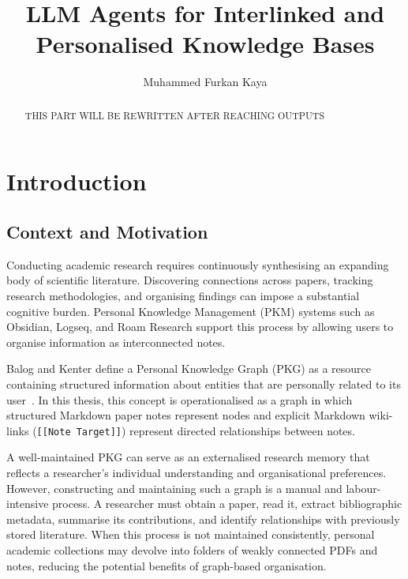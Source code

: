 \documentclass[runningheads]{llncs}
\begin{document}
%
\title{LLM Agents for Interlinked and Personalised Knowledge Bases}
%
%
\author{Muhammed Furkan Kaya}
%
%
%
\maketitle              %
%
\begin{abstract}
THIS PART WILL BE REWRITTEN AFTER REACHING OUTPUTS

\end{abstract}
%
%
%
\section{Introduction}
\label{sec:intro}

\subsection{Context and Motivation}

Conducting academic research requires continuously synthesising an expanding body of scientific literature. Discovering connections across papers, tracking research methodologies, and organising findings can impose a substantial cognitive burden. Personal Knowledge Management (PKM) systems such as Obsidian, Logseq, and Roam Research support this process by allowing users to organise information as interconnected notes.

Balog and Kenter define a Personal Knowledge Graph (PKG) as a resource containing structured information about entities that are personally related to its user~\cite{balog2019personal}. In this thesis, this concept is operationalised as a graph in which structured Markdown paper notes represent nodes and explicit Markdown wiki-links (\texttt{[[Note Target]]}) represent directed relationships between notes.

A well-maintained PKG can serve as an externalised research memory that reflects a researcher's individual understanding and organisational preferences. However, constructing and maintaining such a graph is a manual and labour-intensive process. A researcher must obtain a paper, read it, extract bibliographic metadata, summarise its contributions, and identify relationships with previously stored literature. When this process is not maintained consistently, personal academic collections may devolve into folders of weakly connected PDFs and notes, reducing the potential benefits of graph-based organisation.
\end{document}
